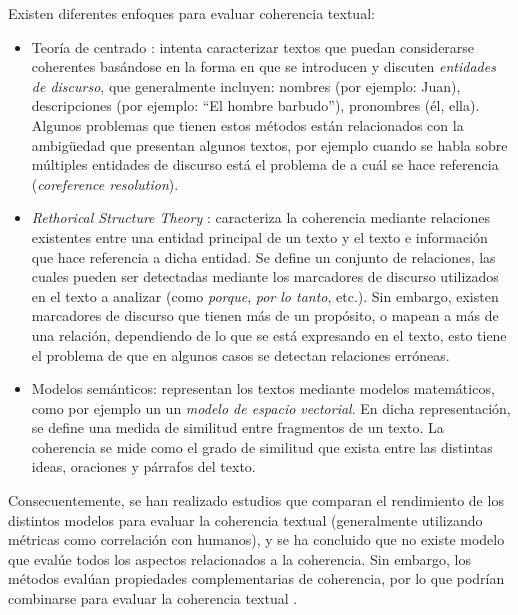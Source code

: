 \documentclass[12pt]{diicc}
\begin{document}
Existen diferentes enfoques para evaluar coherencia textual: 

\begin{itemize}
	\item Teoría de centrado \cite{t36}: intenta caracterizar textos que puedan considerarse coherentes basándose en la forma en que se introducen y discuten {\em entidades de discurso}, que generalmente incluyen: nombres (por ejemplo: Juan), descripciones (por ejemplo: ``El hombre barbudo''), pronombres (él, ella). Algunos problemas que tienen estos métodos están relacionados con la ambigüedad que presentan algunos textos, por ejemplo cuando se habla sobre múltiples entidades de discurso está el problema de a cuál se hace referencia ({\em coreference resolution}).

	\item {\em Rethorical Structure Theory} \cite{t36}: caracteriza la coherencia mediante relaciones existentes entre una entidad principal de un texto y el texto e información que hace referencia a dicha entidad. Se define un conjunto de relaciones, las cuales pueden ser detectadas mediante los marcadores de discurso utilizados en el texto a analizar (como {\em porque}, {\em por lo tanto}, etc.). Sin embargo, existen marcadores de discurso que tienen más de un propósito, o mapean a más de una relación, dependiendo de lo que se está expresando en el texto, esto tiene el problema de que en algunos casos se detectan relaciones erróneas.
	
	\item Modelos semánticos: representan los textos mediante modelos matemáticos, como por ejemplo un un {\em modelo de espacio vectorial}. En dicha representación, se define una medida de similitud entre fragmentos de un texto. La coherencia se mide como el grado de similitud que exista entre las distintas ideas, oraciones y párrafos del texto. 

\end{itemize}

Consecuentemente, se han realizado estudios que comparan el rendimiento de los distintos modelos para evaluar la coherencia textual (generalmente utilizando métricas como correlación con humanos), y se ha concluido que no existe modelo que evalúe todos los aspectos relacionados a la coherencia. Sin embargo, los métodos evalúan propiedades complementarias de coherencia, por lo que podrían combinarse para evaluar la coherencia textual \cite{t33}.

%
% 
\end{document}
